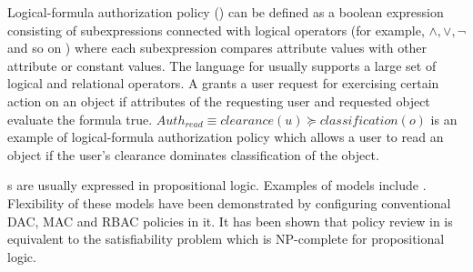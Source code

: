 Logical-formula authorization policy (\LAP{}) can be defined as a boolean expression consisting of subexpressions connected with logical operators (for example, $\land, \lor, \lnot$ and so on ) where each subexpression compares attribute values with other attribute or constant values. The language for \LAP{} usually supports a large set of logical and relational operators. A \LAP{} grants a user request for exercising certain action on an object if attributes of the requesting user and requested object evaluate the formula true. $Auth_{read} \equiv clearance(u) \succeq classification(o)$ is an example of  logical-formula authorization policy which allows a user to read an object if the user's clearance dominates classification of the object.

\LAP{}s are usually expressed in propositional logic. Examples of  \LPModels{} models  include \cite{abacAlpha,hgabac,abac-ws,abac-for-web-service}.  Flexibility of these models have been demonstrated by configuring conventional DAC\cite{dac}, MAC\cite{lbac} and RBAC \cite{rbac} policies in it. It has been shown  \cite{labac} that policy review in  \LPModels{} is equivalent to the satisfiability problem  which is NP-complete for propositional logic. 
\vspace{-1em}
